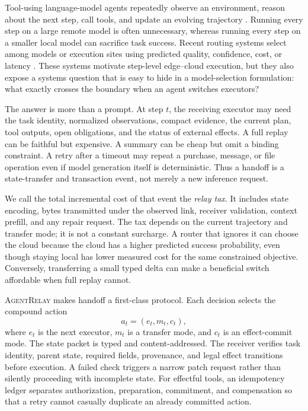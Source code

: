 \documentclass[10pt]{article}
\newcommand{\system}{\textsc{AgentRelay}}
\begin{document}
Tool-using language-model agents repeatedly observe an environment, reason
about the next step, call tools, and update an evolving trajectory
\citep{yao2023react,schick2023toolformer,liu2024agentbench}. Running every
step on a large remote model is often unnecessary, whereas running every step
on a smaller local model can sacrifice task success. Recent routing systems
select among models or execution sites using predicted quality, confidence,
cost, or latency
\citep{chen2024frugalgpt,ong2025routellm,paul2026agentrouter,
zhang2026hera,son2026swerouter,liu2026agenticrouting}. These systems motivate
step-level edge--cloud execution, but they also expose a systems question that
is easy to hide in a model-selection formulation: what exactly crosses the
boundary when an agent switches executors?

The answer is more than a prompt. At step $t$, the receiving executor may
need the task identity, normalized observations, compact evidence, the current
plan, tool outputs, open obligations, and the status of external effects. A
full replay can be faithful but expensive. A summary can be cheap but omit a
binding constraint. A retry after a timeout may repeat a purchase, message,
or file operation even if model generation itself is deterministic. Thus a
handoff is a state-transfer and transaction event, not merely a new inference
request.

We call the total incremental cost of that event the \emph{relay tax}. It
includes state encoding, bytes transmitted under the observed link, receiver
validation, context prefill, and any repair request. The tax depends on the
current trajectory and transfer mode; it is not a constant surcharge. A
router that ignores it can choose the cloud because the cloud has a higher
predicted success probability, even though staying local has lower measured
cost for the same constrained objective. Conversely, transferring a small
typed delta can make a beneficial switch affordable when full replay cannot.

\system{} makes handoff a first-class protocol. Each decision selects the
compound action
\[
 a_t=(e_t,m_t,c_t),
\]
where $e_t$ is the next executor, $m_t$ is a transfer mode, and $c_t$ is an
effect-commit mode. The state packet is typed and content-addressed. The
receiver verifies task identity, parent state, required fields, provenance,
and legal effect transitions before execution. A failed check triggers a
narrow patch request rather than silently proceeding with incomplete state.
For effectful tools, an idempotency ledger separates authorization,
preparation, commitment, and compensation so that a retry cannot casually
duplicate an already committed action.
\end{document}
